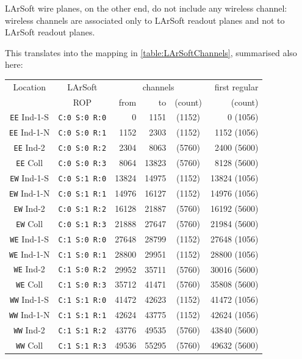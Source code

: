 LArSoft wire planes, on the other end, do not include any wireless channel:
wireless channels are associated only to LArSoft readout planes
and not to LArSoft readout planes.

This translates into the mapping in \cref{table:LArSoftChannels}, summarised also here:
\begin{center}
  \begin{tabular}{|cc|rrc|r|}
    \hline
    \hline
    Location            & LArSoft              & \multicolumn{3}{c|}{channels} & first regular \\
                        & ROP                  &  from &    to & (count) &     (count)  \\
    \hline
    \texttt{EE} Ind-1-S & \texttt{C:0 S:0 R:0} &     0 &  1151 &  (1152) &     0 (1056) \\
    \texttt{EE} Ind-1-N & \texttt{C:0 S:0 R:1} &  1152 &  2303 &  (1152) &  1152 (1056) \\
    \texttt{EE} Ind-2   & \texttt{C:0 S:0 R:2} &  2304 &  8063 &  (5760) &  2400 (5600) \\
    \texttt{EE} Coll    & \texttt{C:0 S:0 R:3} &  8064 & 13823 &  (5760) &  8128 (5600) \\
    \hline
    \texttt{EW} Ind-1-S & \texttt{C:0 S:1 R:0} & 13824 & 14975 &  (1152) & 13824 (1056) \\
    \texttt{EW} Ind-1-N & \texttt{C:0 S:1 R:1} & 14976 & 16127 &  (1152) & 14976 (1056) \\
    \texttt{EW} Ind-2   & \texttt{C:0 S:1 R:2} & 16128 & 21887 &  (5760) & 16192 (5600) \\
    \texttt{EW} Coll    & \texttt{C:0 S:1 R:3} & 21888 & 27647 &  (5760) & 21984 (5600) \\
    \hline
    \hline
    \texttt{WE} Ind-1-S & \texttt{C:1 S:0 R:0} & 27648 & 28799 &  (1152) & 27648 (1056) \\
    \texttt{WE} Ind-1-N & \texttt{C:1 S:0 R:1} & 28800 & 29951 &  (1152) & 28800 (1056) \\
    \texttt{WE} Ind-2   & \texttt{C:1 S:0 R:2} & 29952 & 35711 &  (5760) & 30016 (5600) \\
    \texttt{WE} Coll    & \texttt{C:1 S:0 R:3} & 35712 & 41471 &  (5760) & 35808 (5600) \\
    \hline
    \texttt{WW} Ind-1-S & \texttt{C:1 S:1 R:0} & 41472 & 42623 &  (1152) & 41472 (1056) \\
    \texttt{WW} Ind-1-N & \texttt{C:1 S:1 R:1} & 42624 & 43775 &  (1152) & 42624 (1056) \\
    \texttt{WW} Ind-2   & \texttt{C:1 S:1 R:2} & 43776 & 49535 &  (5760) & 43840 (5600) \\
    \texttt{WW} Coll    & \texttt{C:1 S:1 R:3} & 49536 & 55295 &  (5760) & 49632 (5600) \\
    \hline
    \hline
  \end{tabular}
  \label{tab:LArSoftChannelsReduced}
\end{center}

